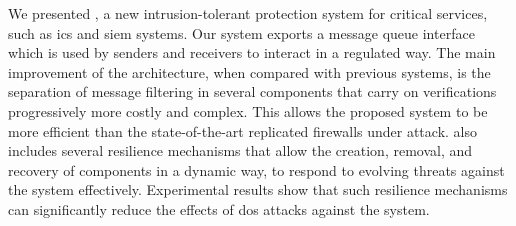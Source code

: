 We presented \sieveq, a new intrusion-tolerant protection system for critical services, such as \gls{ics} and \gls{siem} systems.
Our system exports a message queue interface which is used by senders and receivers to interact in a regulated way.
The main improvement of the \sieveq architecture, when compared with previous systems, is the separation of message filtering in several components that carry on verifications progressively more costly and complex.
This allows the proposed system to be more efficient than the state-of-the-art replicated firewalls under attack.
\sieveq also includes several resilience mechanisms that allow the creation, removal, and recovery of components in a dynamic way, to respond to evolving threats against the system effectively. 
Experimental results show that such resilience mechanisms can significantly reduce the effects of \gls{dos} attacks against the system.


